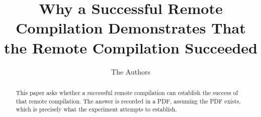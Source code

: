 \documentclass{article}
\title{Why a Successful Remote Compilation Demonstrates That the Remote
Compilation Succeeded}
\author{The Authors}
\date{}
\begin{document}
\maketitle

\begin{abstract}
This paper asks whether a successful remote compilation can establish the
success of that remote compilation. The answer is recorded in a PDF, assuming
the PDF exists, which is precisely what the experiment attempts to establish.
\end{abstract}







\end{document}
